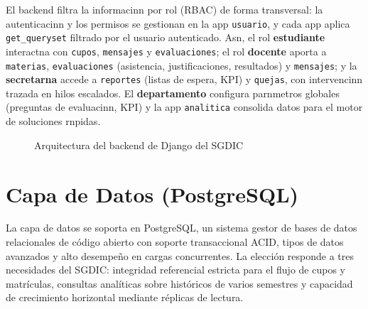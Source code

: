 El backend filtra la informacinn por rol (\ac{RBAC}) de forma transversal: la
autenticacinn y los permisos se gestionan en la app \texttt{usuario}, y cada
app aplica \texttt{get\_queryset} filtrado por el usuario autenticado. Asn, el
rol \textbf{estudiante} interactna con \texttt{cupos}, \texttt{mensajes} y
\texttt{evaluaciones}; el rol \textbf{docente} aporta a \texttt{materias},
\texttt{evaluaciones} (asistencia, justificaciones, resultados) y
\texttt{mensajes}; y la \textbf{secretarna} accede a \texttt{reportes}
(listas de espera, \ac{KPI}) y \texttt{quejas}, con intervencinn trazada en
hilos escalados. El \textbf{departamento} configura parnmetros globales
(preguntas de evaluacinn, \ac{KPI}) y la app \texttt{analitica} consolida
datos para el motor de soluciones rnpidas.
\begin{figure}[H]
\centering
{}%
\caption{Arquitectura del backend de Django del \ac{SGDIC}}
\label{fig:backend}
\end{figure}

\section{Capa de Datos (PostgreSQL)}
\label{sec:datos}

La capa de datos se soporta en PostgreSQL, un sistema gestor de bases de datos
relacionales de código abierto con soporte transaccional \ac{ACID}, tipos de
datos avanzados y alto desempeño en cargas concurrentes. La elección responde a
tres necesidades del \ac{SGDIC}: integridad referencial estricta para el flujo de
cupos y matrículas, consultas analíticas sobre históricos de varios semestres y
capacidad de crecimiento horizontal mediante réplicas de lectura.

